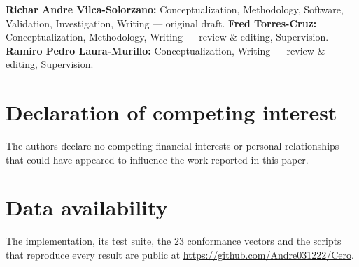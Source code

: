 \documentclass[preprint,12pt]{elsarticle}
\begin{document}
\textbf{Richar Andre Vilca-Solorzano:} Conceptualization, Methodology,
Software, Validation, Investigation, Writing --- original draft.
\textbf{Fred Torres-Cruz:} Conceptualization, Methodology, Writing --- review
\& editing, Supervision. \textbf{Ramiro Pedro Laura-Murillo:}
Conceptualization, Writing --- review \& editing, Supervision.

\section*{Declaration of competing interest}

The authors declare no competing financial interests or personal relationships
that could have appeared to influence the work reported in this paper.

\section*{Data availability}

The implementation, its test suite, the 23 conformance vectors and the scripts
that reproduce every result are public at
\url{https://github.com/Andre031222/Cero}.



\end{document}
